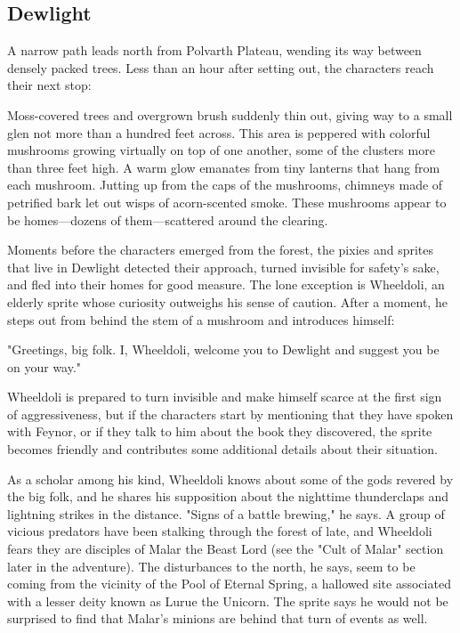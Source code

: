 \documentclass[10pt,a4paper,twoside,bg=print,twocolumn,openany,nodeprecatedcode]{dndbook}
\begin{document}
\subsection{Dewlight}
A narrow path leads north from Polvarth Plateau, wending its way between densely packed trees. Less than an hour after setting out, the characters reach their next stop:

\begin{DndReadAloud}{}
Moss-covered trees and overgrown brush suddenly thin out, giving way to a small glen not more than a hundred feet across. This area is peppered with colorful mushrooms growing virtually on top of one another, some of the clusters more than three feet high. A warm glow emanates from tiny lanterns that hang from each mushroom. Jutting up from the caps of the mushrooms, chimneys made of petrified bark let out wisps of acorn-scented smoke. These mushrooms appear to be homes—dozens of them—scattered around the clearing.

\end{DndReadAloud}

Moments before the characters emerged from the forest, the pixies and sprites that live in Dewlight detected their approach, turned invisible for safety's sake, and fled into their homes for good measure. The lone exception is Wheeldoli, an elderly sprite whose curiosity outweighs his sense of caution. After a moment, he steps out from behind the stem of a mushroom and introduces himself:

\begin{DndReadAloud}{}
"Greetings, big folk. I, Wheeldoli, welcome you to Dewlight and suggest you be on your way."

\end{DndReadAloud}

Wheeldoli is prepared to turn invisible and make himself scarce at the first sign of aggressiveness, but if the characters start by mentioning that they have spoken with Feynor, or if they talk to him about the book they discovered, the sprite becomes friendly and contributes some additional details about their situation.

As a scholar among his kind, Wheeldoli knows about some of the gods revered by the big folk, and he shares his supposition about the nighttime thunderclaps and lightning strikes in the distance. "Signs of a battle brewing," he says. A group of vicious predators have been stalking through the forest of late, and Wheeldoli fears they are disciples of Malar the Beast Lord (see the "Cult of Malar" section later in the adventure). The disturbances to the north, he says, seem to be coming from the vicinity of the Pool of Eternal Spring, a hallowed site associated with a lesser deity known as Lurue the Unicorn. The sprite says he would not be surprised to find that Malar's minions are behind that turn of events as well.
\end{document}
